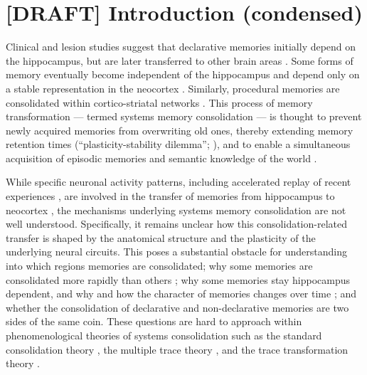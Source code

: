 
\section{[DRAFT] Introduction (condensed)}

Clinical and lesion studies suggest that declarative memories initially depend on the
hippocampus, but are later transferred to other brain areas \cite{Dudai2015, Squire2015,
Sekeres2017}. Some forms of memory eventually become independent of the hippocampus and
depend only on a stable representation in the neocortex \cite{Dudai2015, Squire2015,
Sekeres2017}. Similarly, procedural memories are consolidated within cortico-striatal
networks \cite{Karni1994, Brashers-Krug1996, Dudai2015}. This process of memory
transformation --- termed systems memory consolidation --- is thought to prevent newly
acquired memories from overwriting old ones, thereby extending memory retention times
(``plasticity-stability dilemma''; \cite{Grossberg1987, Abraham2005, Fusi2005,
Leibold2008, Roxin2013}), and to enable a simultaneous acquisition of episodic memories
and semantic knowledge of the world \cite{McClelland1995, Kumaran2016}.

While specific neuronal activity patterns, including accelerated replay of recent
experiences \cite{Lee2002, Skaggs1996}, are involved in the transfer of memories from
hippocampus to neocortex \cite{Diekelmann2010}, the mechanisms underlying systems memory
consolidation are not well understood. Specifically, it remains unclear how this
consolidation-related transfer is shaped by the anatomical structure and the plasticity of
the underlying neural circuits. This poses a substantial obstacle for understanding into
which regions memories are consolidated; why some memories are consolidated more rapidly
than others \cite{Nadel1997, Tse2007, Brodt2018}; why some memories stay hippocampus
dependent, and why and how the character of memories changes over time \cite{Dudai2015};
and whether the consolidation of declarative and non-declarative memories \cite{Karni1994,
Brashers-Krug1996, Dudai2015} are two sides of the same coin. These questions are hard to
approach within phenomenological theories of systems consolidation such as the standard
consolidation theory \cite{Squire1995, McClelland1995}, the multiple trace theory
\cite{Nadel1997}, and the trace transformation theory \cite{Winocur2010, Winocur2011}.

